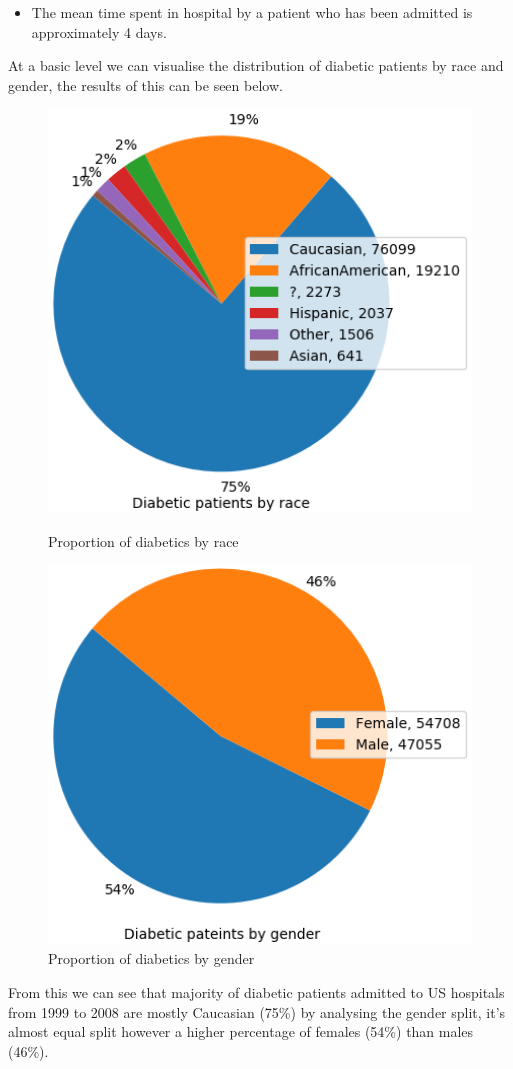 \documentclass[11pt]{report}
\newcommand{\linespace}{\vspace{0.3cm}\noindent}
\begin{document}
\begin{itemize}
	\item The mean time spent in hospital by a patient who has been admitted is approximately 4 days. 
\end{itemize}

\linespace
At a basic level we can visualise the distribution of diabetic patients by race and gender, the results of this can be seen below.

\begin{figure}[ht]
	\begin{minipage}[b]{.5\textwidth}
	\centering
	\includegraphics[width=1\textwidth]{race_pie.png}
	\caption{Proportion of diabetics by race}
	\end{minipage}
	\hfill
	\begin{minipage}[b]{.5\textwidth}
	\centering
	\includegraphics[width=1\textwidth]{gender_pie.png}
\caption{Proportion of diabetics by gender}
\end{minipage}
\end{figure}

\linespace
From this we can see that majority of diabetic patients admitted to US hospitals from 1999 to 2008 are mostly Caucasian (75\%) by analysing the gender split, it's almost equal split however a higher percentage of females (54\%) than males (46\%).
  
\end{document}
